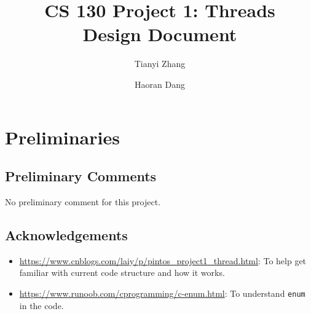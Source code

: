 \documentclass[sigconf, nonacm]{acmart}
\begin{document}
    \title{CS 130 Project 1: Threads\\Design Document}

    \author{Tianyi Zhang}
    \author{Haoran Dang}

    \maketitle

    \setcounter{section}{-1}

    \section{Preliminaries}
        \subsection{Preliminary Comments}

        No preliminary comment for this project. 

        \subsection{Acknowledgements}
        
            \begin{itemize}
                \item \url{https://www.cnblogs.com/laiy/p/pintos_project1_thread.html}: To help get familiar with current code structure and how it works. 
                \item \url{https://www.runoob.com/cprogramming/c-enum.html}: To understand \texttt{enum} in the code. 
            \end{itemize} 
    
\end{document}
